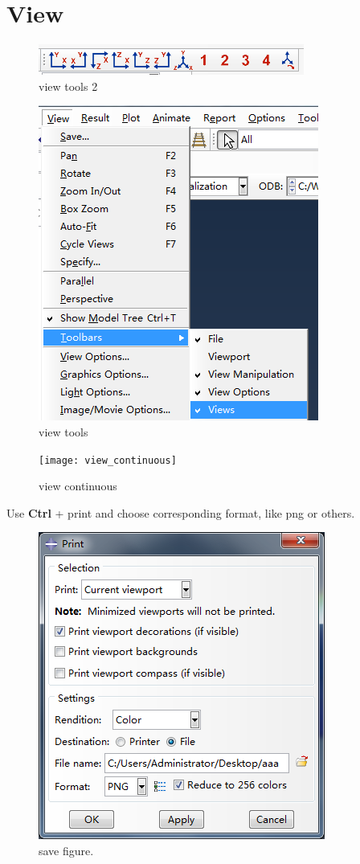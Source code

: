 \documentclass[10pt,a4paper]{article}
\begin{document}
\section{View}
\begin{figure}[h!]
	\centering
	\includegraphics[width=0.5\linewidth]{view_tools2}
	\caption{view tools 2}
	\label{fig:viewstool}
\end{figure}

\begin{figure}[h!]
\centering
\includegraphics[width=0.5\linewidth]{views_tool}
\caption{view tools}
\label{fig:viewstool}
\end{figure}

\begin{figure}[h!]
	\centering
	\texttt{[image: view\_continuous]}
	\caption{view continuous}
	\label{fig:viewstool}
\end{figure}

Use \textbf{Ctrl} + print and choose corresponding format, like png or others.

\begin{figure}[h!]
\centering
\includegraphics[width=0.5\linewidth]{Savefigure}
\caption{save figure.}
\label{fig:savefigure}
\end{figure}
\end{document}
